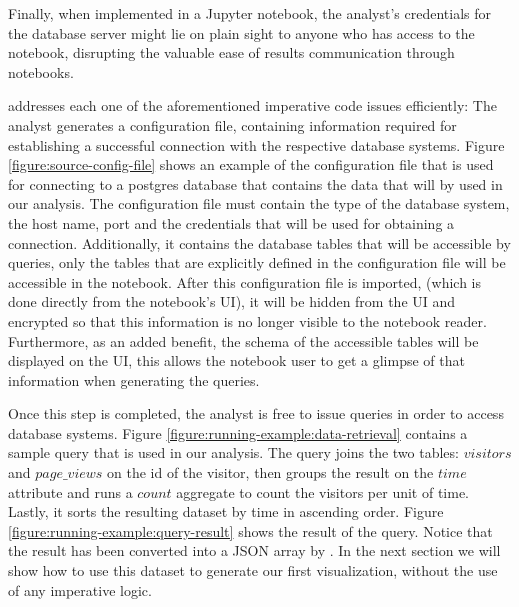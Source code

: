 Finally, when implemented in a Jupyter notebook, the analyst's credentials for the database server might lie on plain sight to anyone who has access to the notebook, disrupting the valuable ease of results communication through notebooks.



{\projname} addresses each one of the aforementioned imperative code issues efficiently: The analyst generates a configuration file, containing information required for establishing a successful connection with the respective database systems. Figure \ref{figure:source-config-file} shows an example of the configuration file that is used for connecting to a postgres database that contains the data that will by used in our analysis. The configuration file must contain the type of the database system, the host name, port and the credentials that will be used for obtaining a connection. Additionally, it contains the database tables that will be accessible by queries, only the tables that are explicitly defined in the configuration file will be accessible in the notebook. After this configuration file is imported, (which is done directly from the notebook's UI), it will be hidden from the UI and encrypted so that this information is no longer visible to the notebook reader.  Furthermore, as an added benefit, the schema of the accessible tables will be displayed on the UI, this allows the notebook user to get a glimpse of that information when generating the queries. 

Once this step is completed, the analyst is free to issue queries in order to access database systems. Figure \ref{figure:running-example:data-retrieval} contains a sample query that is used in our analysis. The query joins the two tables: $visitors$ and $page\_views$ on the id of the visitor, then groups the result on the $time$ attribute and runs a $count$ aggregate to count the visitors per unit of time. Lastly, it sorts the resulting dataset by time in ascending order. Figure \ref{figure:running-example:query-result} shows the result of the query. Notice that the result has been converted into a JSON array by \projname. In the next section we will show how to use this dataset to generate our first visualization, without the use of any imperative logic.

